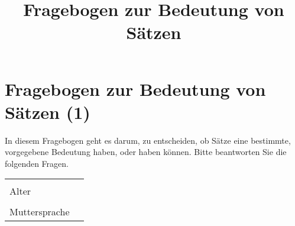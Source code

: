 \documentclass[a4paper, 8pt]{article}
\title{Fragebogen zur Bedeutung von Sätzen}
\begin{document}
\section*{Fragebogen zur Bedeutung von Sätzen (1)}

In diesem Fragebogen geht es darum, zu entscheiden, ob Sätze eine bestimmte, vorgegebene Bedeutung haben, oder haben können. Bitte beantworten Sie die folgenden Fragen.


\begin{tabular}{|l|p{5cm}|}
\hline
& \\
Alter & \\
\hline
& \\
Muttersprache & \\
\hline
\end{tabular}
\end{document}
